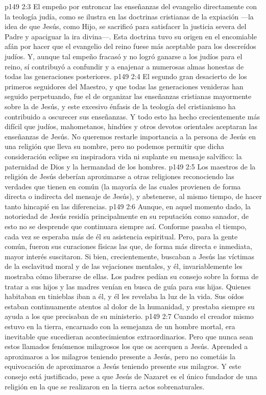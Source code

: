 \vs p149 2:3 El empeño por entroncar las enseñanzas del evangelio directamente con la teología judía, como se ilustra en las doctrinas cristianas de la expiación ---la idea de que Jesús, como Hijo, se sacrificó para satisfacer la justicia severa del Padre y apaciguar la ira divina---. Esta doctrina tuvo su origen en el encomiable afán por hacer que el evangelio del reino fuese más aceptable para los descreídos judíos. Y, aunque tal empeño fracasó y no logró ganarse a los judíos para el reino, sí contribuyó a confundir y a enajenar a numerosas almas honestas de todas las generaciones posteriores.
\vs p149 2:4 El segundo gran desacierto de los primeros seguidores del Maestro, y que todas las generaciones venideras han seguido perpetuando, fue el de organizar las enseñanzas cristianas mayormente sobre la  de Jesús, y este excesivo énfasis de la teología del cristianismo ha contribuido a oscurecer sus enseñanzas. Y todo esto ha hecho crecientemente más difícil que judíos, mahometanos, hindúes y otros devotos orientales aceptaran las enseñanzas de Jesús. No queremos restarle importancia a la persona de Jesús en una religión que lleva su nombre, pero no podemos permitir que dicha consideración eclipse su inspiradora vida ni suplante su mensaje salvífico: la paternidad de Dios y la hermandad de los hombres.
\vs p149 2:5 \pc Los maestros de la religión de Jesús deberían aproximarse a otras religiones reconociendo las verdades que tienen en común (la mayoría de las cuales provienen de forma directa o indirecta del mensaje de Jesús), y abstenerse, al mismo tiempo, de hacer tanto hincapié en las diferencias.
\vs p149 2:6 \pc Aunque, en aquel momento dado, la notoriedad de Jesús residía principalmente en su reputación como sanador, de esto no se desprende que continuara siempre así. Conforme pasaba el tiempo, cada vez se esperaba más de él su asistencia espiritual. Pero, para la gente común, fueron sus curaciones físicas las que, de forma más directa e inmediata, mayor interés suscitaron. Si bien, crecientemente, buscaban a Jesús las víctimas de la esclavitud moral y de las vejaciones mentales, y él, invariablemente les mostraba cómo liberarse de ellas. Los padres pedían su consejo sobre la forma de tratar a sus hijos y las madres venían en busca de guía para sus hijas. Quienes habitaban en tinieblas iban a él, y él les revelaba la luz de la vida. Sus oídos estaban continuamente atentos al dolor de la humanidad, y prestaba siempre su ayuda a los que precisaban de su ministerio.
\vs p149 2:7 Cuando el creador mismo estuvo en la tierra, encarnado con la semejanza de un hombre mortal, era inevitable que sucedieran acontecimientos extraordinarios. Pero que nunca sean estos llamados fenómenos milagrosos los que os acerquen a Jesús. Aprended a aproximaros a los milagros teniendo presente a Jesús, pero no cometáis la equivocación de aproximaros a Jesús teniendo presente sus milagros. Y este consejo está justificado, pese a que Jesús de Nazaret es el único fundador de una religión en la que se realizaron en la tierra actos sobrenaturales.

